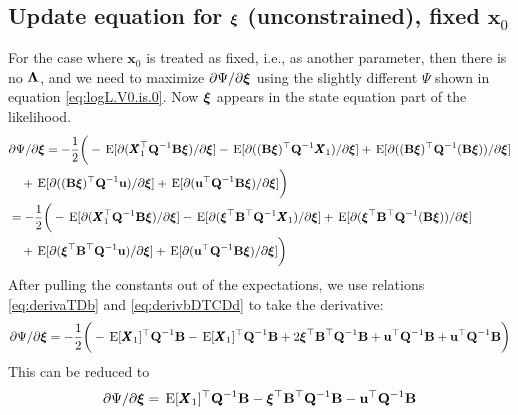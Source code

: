 \documentclass[]{article}
\def\xixi{\mbox{\boldmath $\xi$}}
\def\LAM{\mbox{\boldmath $\Lambda$}}
\def\UPS{\mbox{\boldmath $\Upsilon$}}
\def\BB{\mbox{$\mathbf B$}}	\def\bb{\mbox{$\mathbf b$}} \def\Bb{\mbox{$\mathbf J$}} \def\Ba{\mbox{$\mathbf L$}} \def\Bm{\UPS}
\def\E{\,\textup{\textrm{E}}}
\def\QQ{\mbox{$\mathbf Q$}}	 \def\qq{\mbox{$\mathbf q$}} \def\Qb{\mbox{$\mathbf G$}}  \def\Qm{\mathbb{Q}}
\def\XX{\mbox{$\pmb{X}$}}	\def\xx{\mbox{$\pmb{x}$}}
\begin{document}
\subsection{Update equation for $\xixi$ (unconstrained), fixed $\xx_0$}
For the case where $\xx_0$ is treated as fixed, i.e., as another parameter, then there is no $\LAM$, and we need to maximize $\partial\Psi/\partial\xixi$ using the slightly different $\Psi$ shown in equation \ref{eq:logL.V0.is.0}.  Now $\xixi$ appears in the state equation part of the likelihood.
\begin{equation}\label{eq:pi.unconstrained.V0.is.0}
\begin{split}
&\partial\Psi/\partial\xixi = -\frac{1}{2} \bigg(-\E[\partial(\XX_1^\top\QQ^{-1}\BB\xixi)/\partial\xixi] 
 - \E[\partial((\BB\xixi)^\top\QQ^{-1}\XX_1)/\partial\xixi] + \E[\partial((\BB\xixi)^\top\QQ^{-1}(\BB\xixi))/\partial\xixi] \\
&\quad +  \E[\partial((\BB\xixi)^\top\QQ^{-1}\uu)/\partial\xixi] 
+ \E[\partial(\uu^\top\QQ^{-1}\BB\xixi)/\partial\xixi]\bigg)\\
&= -\frac{1}{2} \bigg(-\E[\partial(\XX_1^\top\QQ^{-1}\BB\xixi)/\partial\xixi] 
 - \E[\partial(\xixi^\top\BB^\top\QQ^{-1}\XX_1)/\partial\xixi] 
+ \E[\partial(\xixi^\top\BB^\top\QQ^{-1}(\BB\xixi))/\partial\xixi] \\
&\quad +  \E[\partial(\xixi^\top\BB^\top\QQ^{-1}\uu)/\partial\xixi] 
+ \E[\partial(\uu^\top\QQ^{-1}\BB\xixi)/\partial\xixi]\bigg)
\end{split}
\end{equation}
After pulling the constants out of the expectations, we use relations \eqref{eq:derivaTDb} and \eqref{eq:derivbDTCDd} to take the derivative:
\begin{equation}\label{eq:pi.unconstrained.V0.is.0.2}
\begin{split}
\partial\Psi/\partial\xixi = -\frac{1}{2} \bigg(-\E[\XX_1]^\top\QQ^{-1}\BB - \E[ \XX_1]^\top\QQ^{-1}\BB 
 + 2 \xixi^\top\BB^\top\QQ^{-1}\BB + \uu^\top\QQ^{-1}\BB  +  \uu^\top\QQ^{-1}\BB \bigg) \\
\end{split}
\end{equation}
This can be reduced to
\begin{equation}\label{eq:pi.unconstrained.V0.is.0.3}
\begin{split}
\partial\Psi/\partial\xixi = \E[\XX_1]^\top\QQ^{-1}\BB - \xixi^\top\BB^\top\QQ^{-1}\BB - \uu^\top\QQ^{-1}\BB 
\end{split}
\end{equation}
\end{document}
